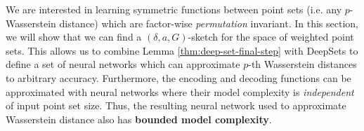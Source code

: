 \documentclass[12pt]{article}
\newcommand{\R}{\mathbb R}
\newcommand{\yusu}[1]		{{ \textcolor{darkgreen} {{\sc [Yusu]:} #1}}}
\newcommand{\yusuedit}[1] {{\textcolor{darkred}{#1}}}
\newcommand{\samedit}[1]{{{\textcolor{darkblue}{#1}}}}
\begin{document}
We are interested in learning symmetric functions between point sets (i.e. any $p$-Wasserstein distance) which are factor-wise \textit{permutation} invariant. 
In this section, we will show that we can find a $(\delta, a, G)$-sketch for the space of weighted point sets. This allows us to combine Lemma \ref{thm:deep-set-final-step} with DeepSets to define a set of neural networks which can approximate $p$-th Wasserstein distances to arbitrary accuracy. Furthermore, the encoding and decoding functions can be approximated with neural networks where their model complexity is \textit{independent} of input point set size. Thus, the resulting neural network used to approximate Wasserstein distance also has {\bf bounded model complexity}. 


\end{document}
